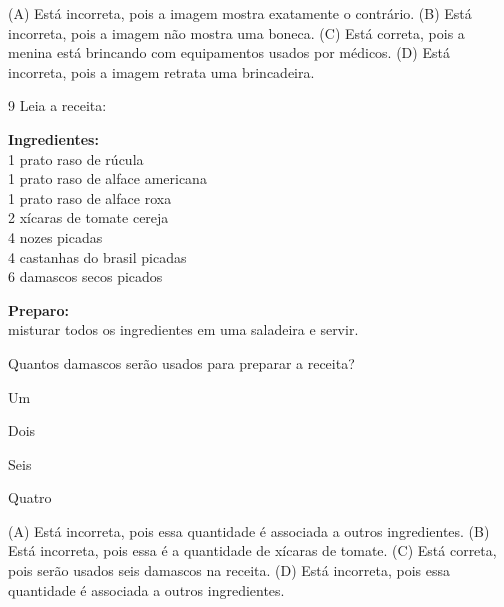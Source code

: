 
(A) Está incorreta, pois a imagem mostra exatamente o contrário.
(B) Está incorreta, pois a imagem não mostra uma boneca.
(C) Está correta, pois a menina está brincando com equipamentos usados por médicos.
(D) Está incorreta, pois a imagem retrata uma brincadeira.

\num{9} Leia a receita:

\textbf{Ingredientes:}\\
1 prato raso de rúcula\\
1 prato raso de alface americana\\
1 prato raso de alface roxa\\
2 xícaras de tomate cereja\\
4 nozes picadas\\
4 castanhas do brasil picadas\\
6 damascos secos picados

\textbf{Preparo:}\\
misturar todos os ingredientes em uma saladeira e servir.


Quantos damascos serão usados para preparar a receita?

\begin{minipage}{.5\textwidth}
\begin{escolha}
\item Um

\item Dois

\item Seis

\item Quatro
\end{escolha}
\end{minipage}

(A) Está incorreta, pois essa quantidade é associada a outros ingredientes.
(B) Está incorreta, pois essa é a quantidade de xícaras de tomate.
(C) Está correta, pois serão usados seis damascos na receita.
(D) Está incorreta, pois essa quantidade é associada a outros ingredientes.

